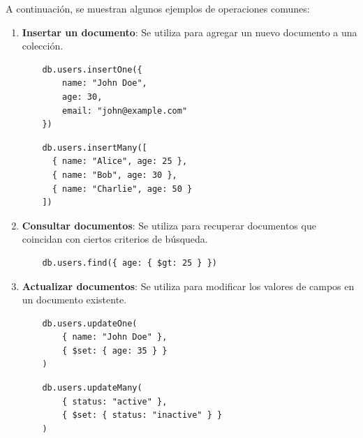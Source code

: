 \documentclass[pdflatex,sn-mathphys-num]{sn-jnl}
\theoremstyle{thmstyleone}%
\theoremstyle{thmstyletwo}%
\theoremstyle{thmstylethree}%
\begin{document}
A continuación, se muestran algunos ejemplos de operaciones comunes:

\begin{enumerate}
    \item \textbf{Insertar un documento}: Se utiliza para agregar un nuevo documento a una colección.

    \begin{multicols}{2}
        \begin{verbatim}
    db.users.insertOne({
        name: "John Doe",
        age: 30,
        email: "john@example.com"
    })
        \end{verbatim}
    
        \columnbreak
        
        \begin{verbatim}
    db.users.insertMany([
      { name: "Alice", age: 25 },
      { name: "Bob", age: 30 },
      { name: "Charlie", age: 50 }
    ])
        \end{verbatim}
    \end{multicols}
    
    \vspace{-0.25cm}
    
    \item \textbf{Consultar documentos}: Se utiliza para recuperar documentos que coincidan con ciertos criterios de búsqueda.
    
    \begin{verbatim}
    db.users.find({ age: { $gt: 25 } })
    \end{verbatim}

    \vspace{-0.25cm}
    
    \item \textbf{Actualizar documentos}: Se utiliza para modificar los valores de campos en un documento existente.

    \begin{multicols}{2}
        \begin{verbatim}
    db.users.updateOne(
        { name: "John Doe" },
        { $set: { age: 35 } }
    )
        \end{verbatim}
    
        \columnbreak
        
        \begin{verbatim}
    db.users.updateMany(
        { status: "active" }, 
        { $set: { status: "inactive" } }
    )
        \end{verbatim}
    \end{multicols}


\end{enumerate}
\end{document}
